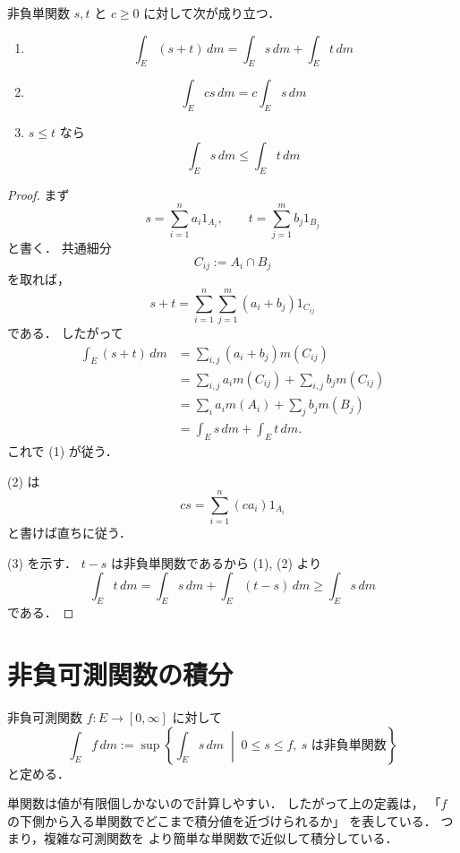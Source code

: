 \begin{proposition}[単関数の基本性質]
非負単関数 $s,t$ と $c \ge 0$ に対して次が成り立つ．
\begin{enumerate}
    \item
    \[
    \int_E (s+t)\,dm = \int_E s\,dm + \int_E t\,dm
    \]
    \item
    \[
    \int_E cs\,dm = c \int_E s\,dm
    \]
    \item $s \le t$ なら
    \[
    \int_E s\,dm \le \int_E t\,dm
    \]
\end{enumerate}
\end{proposition}
\begin{proof}
まず
\[
s=\sum_{i=1}^n a_i 1_{A_i},
\qquad
t=\sum_{j=1}^m b_j 1_{B_j}
\]
と書く．
共通細分
\[
C_{ij}:=A_i \cap B_j
\]
を取れば，
\[
s+t=\sum_{i=1}^n \sum_{j=1}^m (a_i+b_j)1_{C_{ij}}
\]
である．
したがって
\begin{align*}
\int_E (s+t)\,dm
&=
\sum_{i,j}(a_i+b_j)m(C_{ij}) \\
&=
\sum_{i,j}a_i m(C_{ij})+\sum_{i,j}b_j m(C_{ij}) \\
&=
\sum_i a_i m(A_i)+\sum_j b_j m(B_j) \\
&=
\int_E s\,dm+\int_E t\,dm.
\end{align*}
これで (1) が従う．

(2) は
\[
cs=\sum_{i=1}^n (ca_i)1_{A_i}
\]
と書けば直ちに従う．

(3) を示す．
$t-s$ は非負単関数であるから (1), (2) より
\[
\int_E t\,dm
=
\int_E s\,dm+\int_E (t-s)\,dm
\ge
\int_E s\,dm
\]
である．
\end{proof}

\section{非負可測関数の積分}

\begin{definition}[非負可測関数のLebesgue積分]
非負可測関数 $f:E \to [0,\infty]$ に対して
\[
\int_E f\,dm
:=
\sup\left\{
\int_E s\,dm
\;\middle|\;
0 \le s \le f,\ s \text{ は非負単関数}
\right\}
\]
と定める．
\end{definition}

\begin{remark}
単関数は値が有限個しかないので計算しやすい．
したがって上の定義は，
「$f$ の下側から入る単関数でどこまで積分値を近づけられるか」
を表している．
つまり，複雑な可測関数を
より簡単な単関数で近似して積分している．
\end{remark}

